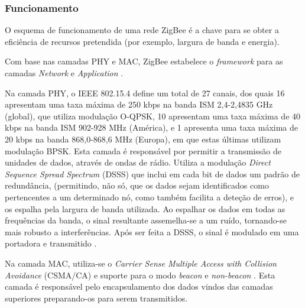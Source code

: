 \documentclass[conference]{IEEEtran}
\begin{document}
\subsubsection{Funcionamento}


O esquema de funcionamento de uma rede ZigBee é a chave para se obter a eficiência de recursos pretendida (por exemplo, largura de banda e energia).

Com base nas camadas PHY e MAC, ZigBee estabelece o \textit{framework} para as camadas \textit{Network} e \textit{Application} \cite{liang2006impact}.

Na camada PHY, o IEEE 802.15.4 define um total de 27 canais, dos quais 16 apresentam uma taxa máxima de 250 kbps na banda ISM 2,4-2,4835 GHz (global), que utiliza modulação O-QPSK, 10 apresentam uma taxa máxima de 40 kbps na banda ISM 902-928 MHz (América), e 1 apresenta uma taxa máxima de 20 kbps na banda 868,0-868,6 MHz (Europa), em que estas últimas utilizam modulação BPSK.
Esta camada é responsável por permitir a transmissão de unidades de dados, através de ondas de rádio.
Utiliza a modulação \textit{Direct Sequence Spread Spectrum} (DSSS) que inclui em cada bit de dados um padrão de redundância, (permitindo, não só, que os dados sejam identificados como pertencentes a um determinado nó, como também facilita a deteção de erros), e os espalha pela largura de banda utilizada.
Ao espalhar os dados em todas as frequências da banda, o sinal resultante assemelha-se a um ruído, tornando-se mais robusto a interferências. 
Após ser feita a DSSS, o sinal é modulado em uma portadora e transmitido \cite{liang2006impact}.

Na camada MAC, utiliza-se o \textit{Carrier Sense Multiple Access with Collision Avoidance} (CSMA/CA) e suporte para o modo \textit{beacon} e \textit{non-beacon} \cite{liang2006impact}.
Esta camada é responsável pelo encapsulamento dos dados vindos das camadas superiores preparando-os para serem transmitidos.
\end{document}
